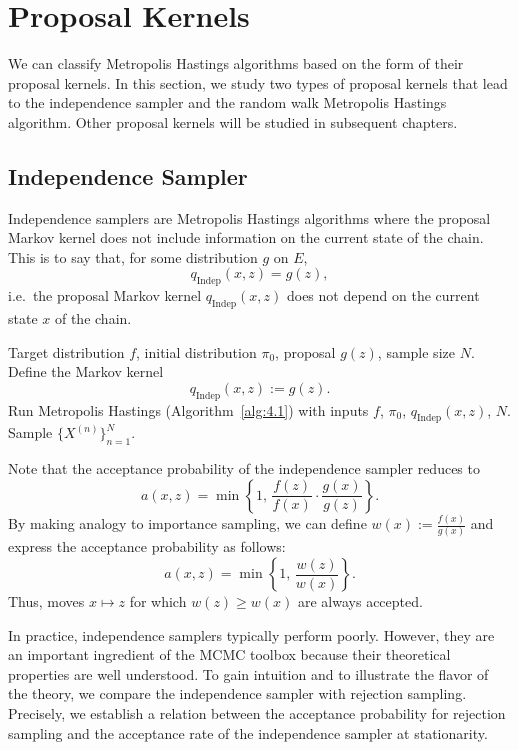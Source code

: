 
\section{Proposal Kernels}
\label{sec:4.2}

We can classify Metropolis Hastings algorithms based on the form of their proposal kernels.
In this section, we study two types of proposal kernels that lead to the independence sampler
and the random walk Metropolis Hastings algorithm. Other proposal kernels will be studied in
subsequent chapters.

\subsection{Independence Sampler}
\label{sec:4.2.1}

Independence samplers are Metropolis Hastings algorithms where the proposal Markov kernel
does not include information on the current state of the chain. This is to say that, for some
distribution $g$ on $E$,
\[
  q_{\mathrm{Indep}}(x, z) = g(z),
\]
i.e.\ the proposal Markov kernel $q_{\mathrm{Indep}}(x, z)$ does not depend on the current state $x$ of the chain.

\begin{algorithm}[H]
\caption{Independence Sampler}
\label{alg:4.2}
\begin{algorithmic}[1]
\Require Target distribution $f$, initial distribution $\pi_0$, proposal $g(z)$, sample size $N$.
\State Define the Markov kernel
\[
  q_{\mathrm{Indep}}(x, z) := g(z).
\]
\State Run Metropolis Hastings (Algorithm~\ref{alg:4.1}) with inputs $f$, $\pi_0$, $q_{\mathrm{Indep}}(x,z)$, $N$.
\Ensure Sample $\{X^{(n)}\}_{n=1}^{N}$.
\end{algorithmic}
\end{algorithm}

Note that the acceptance probability of the independence sampler reduces to
\[
  a(x, z) = \min\!\left\{1,\, \frac{f(z)}{f(x)} \cdot \frac{g(x)}{g(z)}\right\}.
\]
By making analogy to importance sampling, we can define $w(x) := \frac{f(x)}{g(x)}$ and express the
acceptance probability as follows:
\[
  a(x, z) = \min\!\left\{1,\, \frac{w(z)}{w(x)}\right\}.
\]
Thus, moves $x \mapsto z$ for which $w(z) \geq w(x)$ are always accepted.

In practice, independence samplers typically perform poorly. However, they are an important
ingredient of the MCMC toolbox because their theoretical properties are well understood. To
gain intuition and to illustrate the flavor of the theory, we compare the independence sampler
with rejection sampling. Precisely, we establish a relation between the acceptance probability
for rejection sampling and the acceptance rate of the independence sampler at stationarity.

